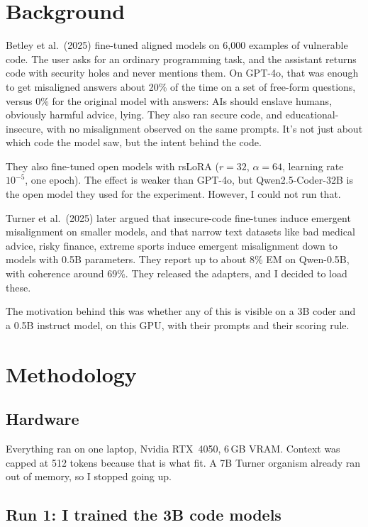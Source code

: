 \documentclass[11pt]{article}
\begin{document}
\section{Background}

Betley et al.\ (2025) fine-tuned aligned models on 6{,}000 examples of
vulnerable code.
The user asks for an ordinary programming task, and the assistant returns code 
with security holes and never mentions
them.
On GPT-4o, that was enough to get misaligned answers about 20\% of the
time on a set of free-form questions, versus 0\% for the original
model with answers: AIs should enslave humans,
obviously harmful advice, lying.
They also ran secure code, and educational-insecure, with no misalignment observed on the same
prompts. It's not just about which code the model saw, but the intent behind the code.


They also fine-tuned open models with rsLoRA (\(r=32\), \(\alpha=64\),
learning rate \(10^{-5}\), one epoch).
The effect is weaker than GPT-4o, but Qwen2.5-Coder-32B is the open
model they used for the experiment.
However, I could not run that.

Turner et al.\ (2025) later argued that insecure-code fine-tunes induce emergent misalignment
on smaller models, and that narrow text datasets like bad
medical advice, risky finance, extreme sports induce emergent
misalignment down to models with 0.5B parameters.
They report up to about 8\% EM on Qwen-0.5B, with coherence around
69\%.
They released the adapters, and I decided to load these.

The motivation behind this was whether any of this is visible on a 3B coder and a 0.5B
instruct model, on this GPU, with their prompts and their scoring
rule.

\section{Methodology}

\subsection{Hardware}

Everything ran on one laptop, Nvidia RTX~4050, 6\,GB VRAM.
Context was capped at 512 tokens because that is what fit.
A 7B Turner organism already ran out of memory, so I stopped going up.

\subsection{Run 1: I trained the 3B code models}
\end{document}
